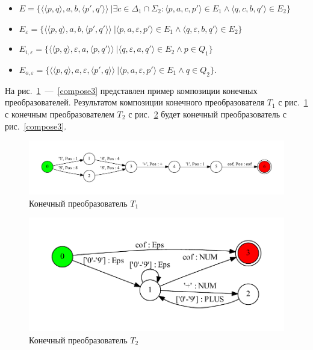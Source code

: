 \begin{itemize}
\item $E = \{ \langle \langle p, q \rangle, a, b, \langle p', q' \rangle \rangle\ | \exists c \in \Delta_1 \cap \Sigma_2 : \langle p, a, c, p' \rangle \in E_1 \wedge \langle q, c, b, q' \rangle \in E_2\}$
\item $E_{\varepsilon} = \{ \langle \langle p, q \rangle, a, b, \langle p', q' \rangle \rangle\ | \langle p, a, {\varepsilon}, p' \rangle \in E_1 \wedge \langle q, {\varepsilon}, b, q' \rangle \in E_2\}$
\item $E_{i, \varepsilon} = \{ \langle \langle p, q \rangle, {\varepsilon}, a, \langle p, q' \rangle \rangle\ | \langle q, {\varepsilon}, a, q' \rangle \in E_2 \wedge p \in Q_1 \} $
\item $E_{o, \varepsilon} = \{ \langle \langle p, q \rangle,  a, {\varepsilon}, \langle p', q \rangle \rangle\ | \langle p, a, {\varepsilon}, p' \rangle \in E_1 \wedge q \in Q_2 \}. $
\end{itemize}

На рис.~\ref{compose1}~---~\ref{compose3} представлен пример композиции конечных преобразователей. Результатом композиции конечного преобразователя $T_1$ с рис.~\ref{compose1} с конечным преобразователем $T_2$ с рис.~\ref{compose2} будет конечный преобразователь с рис.~\ref{compose3}.

\begin{figure}[h!]
        \includegraphics[width=\linewidth]{Gumin/pictures/example_.pdf}
        \caption{Конечный преобразователь $T_1$}
        \label{compose1} 
\end{figure}

\begin{figure}[h!]
        \includegraphics[width=\textwidth]{Gumin/pictures/lexer_.pdf}
        \caption{Конечный преобразователь $T_2$}
        \label{compose2} 
\end{figure}


